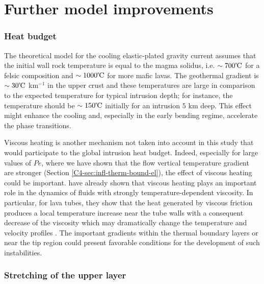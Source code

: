 \section{Further model improvements}
\label{sec:generalization-model}

\subsubsection*{Heat budget}
\label{subsubsection}

The theoretical  model for the cooling  elastic-plated gravity current
assumes that the  initial wall rock temperature is equal  to the magma
solidus,  i.e.   $\sim 700  \celsius$  for  a felsic  composition  and
$\sim 1000 \celsius$ for more mafic lavas.  The geothermal gradient is
$\sim 30 \celsius$ km$^{-1}$ in the upper crust and these temperatures
are  large  in comparison  to  the  expected temperature  for  typical
intrusion   depth;   for   instance,   the   temperature   should   be
$\sim  150 \celsius$  initially for  an intrusion  $5$ km  deep.  This
effect might enhance the cooling  and, especially in the early bending
regime, accelerate the phase transitions.

Viscous heating  is another mechanism  not taken into account  in this
study   that  would   participate   to  the   global  intrusion   heat
budget. Indeed,  especially for  large values of  $Pe$, where  we have
shown  that  the  flow  vertical  temperature  gradient  are  stronger
(Section  \ref{C4-sec:infl-therm-bound-el}),  the  effect  of  viscous
heating could  be important.  \citet{Costa:2005bq} have  already shown
that viscous heating plays an important role in the dynamics of fluids
with strongly temperature-dependent viscosity. In particular, for lava
tubes, they show that the  heat generated by viscous friction produces
a local  temperature increase  near the tube  walls with  a consequent
decrease  of   the  viscosity   which  may  dramatically   change  the
temperature             and              velocity             profiles
\citep{Costa:2002cj,Costa:2003wk,Costa:2005bq}.      The     important
gradients within  the thermal boundary  layers or near the  tip region
could  present  favorable  conditions  for  the  development  of  such
instabilities.

\subsubsection*{Stretching of the upper layer}
\label{subsubsection}

